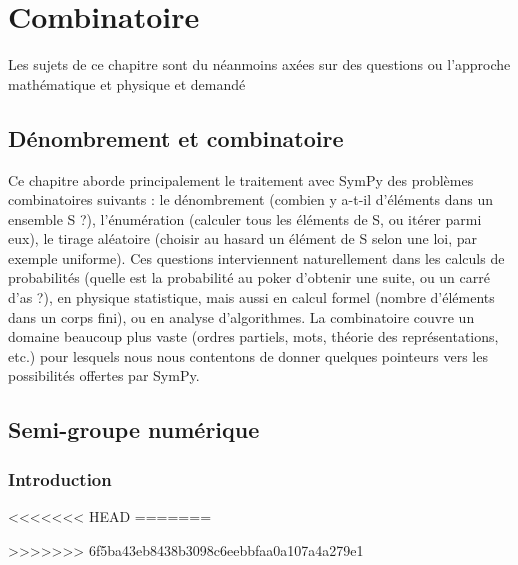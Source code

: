 \part{Combinatoire}

Les sujets de ce chapitre sont du néanmoins axées sur des questions ou l'approche mathématique et 
physique et demandé 

\chapter{Dénombrement et combinatoire}
Ce chapitre aborde principalement le traitement avec SymPy des problèmes
combinatoires suivants : le dénombrement (combien y a-t-il d’éléments dans un
ensemble S ?), l’énumération (calculer tous les éléments de S, ou itérer parmi
eux), le tirage aléatoire (choisir au hasard un élément de S selon une loi, par
exemple uniforme). Ces questions interviennent naturellement dans les calculs de
probabilités (quelle est la probabilité au poker d’obtenir une suite, ou un carré
d’as ?), en physique statistique, mais aussi en calcul formel (nombre d’éléments
dans un corps fini), ou en analyse d’algorithmes. La combinatoire couvre un
domaine beaucoup plus vaste (ordres partiels, mots, théorie des représentations,
etc.) pour lesquels nous nous contentons de donner quelques pointeurs vers les
possibilités offertes par SymPy.
\chapter{Semi-groupe numérique}
\section{Introduction}
<<<<<<< HEAD
=======

>>>>>>> 6f5ba43eb8438b3098c6eebbfaa0a107a4a279e1
 
